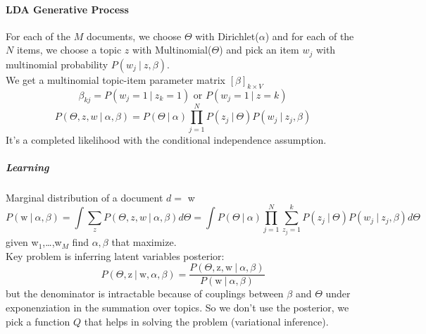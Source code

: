 \documentclass[10pt]{report}
\begin{document}
\paragraph{LDA Generative Process} For each of the $M$ documents, we choose $\Theta$ with Dirichlet($\alpha$) and for each of the $N$ items, we choose a topic $z$ with Multinomial($\Theta$) and pick an item $w_j$ with multinomial probability $P(w_j\:|\:z,\beta)$.\\
We get a multinomial topic-item parameter matrix $[\beta]_{k\times V}$
$$\beta_{kj}=P(w_j=1\:|\:z_k=1)\text{ or } P(w_j=1\:|\:z=k)$$
$$P(\Theta, z, w\:|\:\alpha,\beta) = P(\Theta\:|\:\alpha)\prod_{j=1}^NP(z_j\:|\:\Theta)P(w_j\:|\:z_j,\beta)$$
It's a completed likelihood with the conditional independence assumption.
\subparagraph{Learning} Marginal distribution of a document $d =$ w
$$P(\text{w}\:|\:\alpha,\beta) = \int \sum_z P(\Theta,z,w\:|\:\alpha,\beta)d\Theta=\int P(\Theta\:|\:\alpha)\prod_{j=1}^N\sum_{z_j=1}^kP(z_j\:|\:\Theta)P(w_j\:|\:z_j,\beta)d\Theta$$
given w$_1$,\ldots,w$_M$ find $\alpha,\beta$ that maximize.\\
Key problem is inferring latent variables posterior:
$$P(\Theta, \text{z}\:|\:\text{w},\alpha,\beta) = \frac{P(\Theta, \text{z}, \text{w}\:|\:\alpha,\beta)}{P(\text{w}\:|\:\alpha,\beta)}$$
but the denominator is intractable because of couplings between $\beta$ and $\Theta$ under exponenziation in the summation over topics. So we don't use the posterior, we pick a function $Q$ that helps in solving the problem (variational inference).
\end{document}

